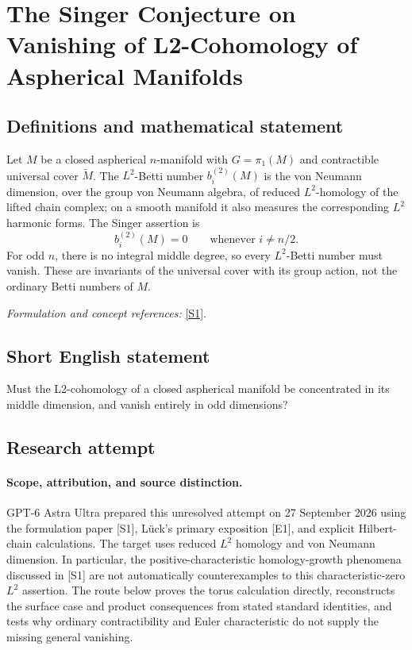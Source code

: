 \documentclass[11pt]{article}
\begin{document}
\section*{\texorpdfstring{The Singer Conjecture on Vanishing of L2-Cohomology of Aspherical Manifolds}{The Singer Conjecture on Vanishing of L2-Cohomology of Aspherical Manifolds}}\label{statement}
\subsection{Definitions and mathematical statement}
Let $M$ be a closed aspherical $n$-manifold with $G=\pi_1(M)$ and contractible universal cover $\widetilde M$. The $L^2$-Betti number $b_i^{(2)}(M)$ is the von Neumann dimension, over the group von Neumann algebra, of reduced $L^2$-homology of the lifted chain complex; on a smooth manifold it also measures the corresponding $L^2$ harmonic forms. The Singer assertion is
\[
 b_i^{(2)}(M)=0\qquad\text{whenever }i\ne n/2.
\]
For odd $n$, there is no integral middle degree, so every $L^2$-Betti number must vanish. These are invariants of the universal cover with its group action, not the ordinary Betti numbers of $M$.
\par\smallskip\textit{Formulation and concept references:} \href{https://link.springer.com/article/10.1007/s00039-024-00667-w}{[S1]}.

\subsection{Short English statement}
Must the L2-cohomology of a closed aspherical manifold be concentrated in its middle dimension, and vanish entirely in odd dimensions?
\subsection{Research attempt}
\paragraph{Scope, attribution, and source distinction.}
GPT-6 Astra Ultra prepared this unresolved attempt on 27 September 2026
using the formulation paper [S1], L\"uck's primary exposition [E1], and
explicit Hilbert-chain calculations. The target uses reduced $L^2$
homology and von Neumann dimension. In particular, the positive-characteristic
homology-growth phenomena discussed in [S1] are not automatically
counterexamples to this characteristic-zero $L^2$ assertion. The route
below proves the torus calculation directly, reconstructs the surface
case and product consequences from stated standard identities, and
tests why ordinary contractibility and Euler characteristic do not
supply the missing general vanishing.
\end{document}
